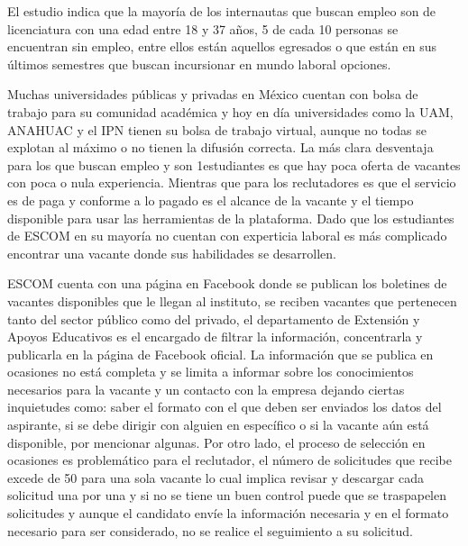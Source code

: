     El estudio indica que la mayoría de los internautas que buscan empleo son de licenciatura con una edad entre 18 y 37
    años, 5 de cada 10 personas se encuentran sin empleo, entre ellos están aquellos egresados o que están en sus últimos
    semestres que buscan incursionar en mundo laboral opciones.
    \newline

    Muchas universidades públicas y privadas en México cuentan con bolsa de trabajo para su comunidad académica y
    hoy en día universidades como la UAM, ANAHUAC y el IPN tienen su bolsa de trabajo virtual, aunque no todas se
    explotan al máximo o no tienen la difusión correcta. La más clara desventaja para los que buscan empleo y son
    1estudiantes es que hay poca oferta de vacantes con poca o nula experiencia. Mientras que para los reclutadores es que
    el servicio es de paga y conforme a lo pagado es el alcance de la vacante y el tiempo disponible para usar las
    herramientas de la plataforma. Dado que los estudiantes de ESCOM en su mayoría no cuentan con experticia laboral
    es más complicado encontrar una vacante donde sus habilidades se desarrollen. 

    ESCOM cuenta con una página en Facebook donde se publican los boletines de vacantes disponibles que le llegan al instituto, 
    se reciben vacantes que pertenecen tanto del sector público como del privado, el departamento de Extensión y Apoyos Educativos 
    es el encargado de filtrar la información, concentrarla y publicarla en la página de Facebook
    oficial.
    La información que se publica en ocasiones no está completa y se limita a informar sobre los conocimientos necesarios
    para la vacante y un contacto con la empresa dejando ciertas inquietudes como: saber el formato con el que deben ser
    enviados los datos del aspirante, si se debe dirigir con alguien en específico o si la vacante aún está disponible, por
    mencionar algunas.
    Por otro lado, el proceso de selección en ocasiones es problemático para el reclutador, el número de solicitudes que
    recibe excede de 50 para una sola vacante lo cual implica revisar y descargar cada solicitud una por una y si no se
    tiene un buen control puede que se traspapelen solicitudes y aunque el candidato envíe la información necesaria y en
    el formato necesario para ser considerado, no se realice el seguimiento a su solicitud.
